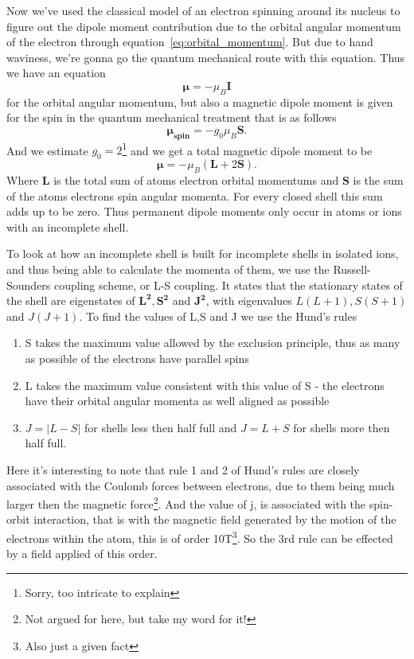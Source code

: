 \documentclass[11pt]{article}
\begin{document}
Now we've used the classical model of an electron spinning around its nucleus to figure out the dipole moment contribution due to the orbital angular momentum of the electron through equation~\ref{eq:orbital_momentum}. But due to hand waviness, we're gonna go the quantum mechanical route with this equation. Thus we have an equation 
\begin{equation}
	\pmb{\mu} = -\mu_B \pmb{I}
\end{equation}
for the orbital angular momentum, but also a magnetic dipole moment is given for the spin in the quantum mechanical treatment that is as follows
\begin{equation}
	\pmb{\mu_{spin}} = - g_0 \mu_B \pmb{S}.
\end{equation}
And we estimate $g_0=2$\footnote{Sorry, too intricate to explain} and we get a total magnetic dipole moment to be
\begin{equation}
	\pmb{\mu} = - \mu_B (\pmb{L}+2\pmb{S}).
	\label{eq:total_angular_momentum}
\end{equation}
Where $\pmb{L}$ is the total sum of atoms electron orbital momentums and $\pmb{S}$ is the sum of the atoms electrons spin angular momenta. For every closed shell this sum adds up to be zero. Thus permanent dipole moments only occur in atoms or ions with an incomplete shell. 

To look at how an incomplete shell is built for incomplete shells in isolated ions, and thus being able to calculate the momenta of them, we use the Russell-Sounders coupling scheme, or L-S coupling. It states that the stationary states of the shell are eigenstates of $\pmb{L^2}, \pmb{S^2}$ and $\pmb{J^2}$, with eigenvalues $L(L+1), S(S+1)$ and $J(J+1)$. To find the values of L,S and J we use the Hund's rules
\begin{enumerate}
	\item S takes the maximum value allowed by the exclusion principle, thus as many as possible of the electrons have parallel spins
	\item L takes the maximum value consistent with this value of S - the electrons have their orbital angular momenta as well aligned as possible
	\item $J = |L-S|$ for shells less then half full and $J = L+S$ for shells more then half full.
\end{enumerate}

Here it's interesting to note that rule 1 and 2 of Hund's rules are closely associated with the Coulomb forces between electrons, due to them being much larger then the magnetic force\footnote{Not argued for here, but take my word for it!}. And the value of j, is associated with the spin-orbit interaction, that is with the magnetic field generated by the motion of the electrons within the atom, this is of order 10T\footnote{Also just a given fact}. So the 3rd rule can be effected by a field applied of this order.
\end{document}
